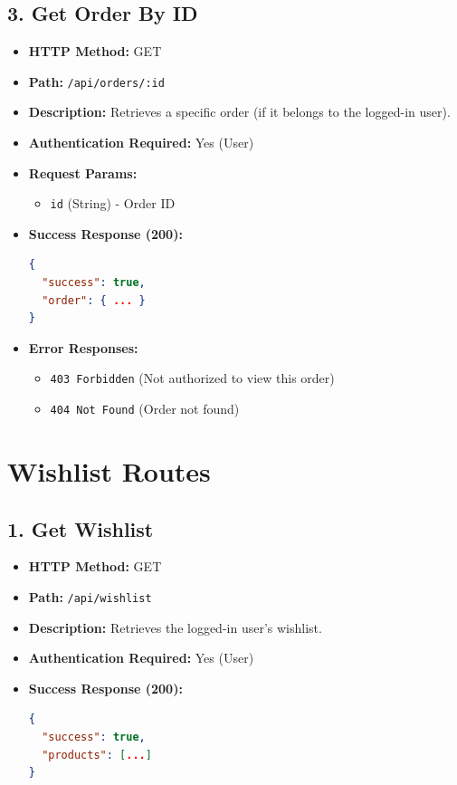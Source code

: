 \documentclass[12pt,a4paper]{article}
\begin{document}
\subsection{3. Get Order By ID}
\begin{itemize}
    \item \textbf{HTTP Method:} GET
    \item \textbf{Path:} \texttt{/api/orders/:id}
    \item \textbf{Description:} Retrieves a specific order (if it belongs to the logged-in user).
    \item \textbf{Authentication Required:} Yes (User)
    \item \textbf{Request Params:}
    \begin{itemize}
        \item \texttt{id} (String) - Order ID
    \end{itemize}
    \item \textbf{Success Response (200):}
\begin{lstlisting}[language=json]
{
  "success": true,
  "order": { ... }
}
\end{lstlisting}
    \item \textbf{Error Responses:}
    \begin{itemize}
        \item \texttt{403 Forbidden} (Not authorized to view this order)
        \item \texttt{404 Not Found} (Order not found)
    \end{itemize}
\end{itemize}

\section{Wishlist Routes}

\subsection{1. Get Wishlist}
\begin{itemize}
    \item \textbf{HTTP Method:} GET
    \item \textbf{Path:} \texttt{/api/wishlist}
    \item \textbf{Description:} Retrieves the logged-in user's wishlist.
    \item \textbf{Authentication Required:} Yes (User)
    \item \textbf{Success Response (200):}
\begin{lstlisting}[language=json]
{
  "success": true,
  "products": [...]
}
\end{lstlisting}
\end{itemize}
\end{document}
